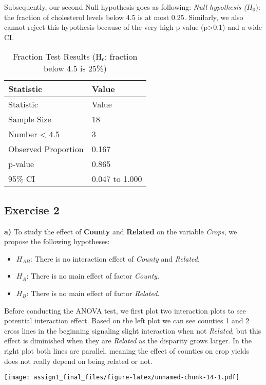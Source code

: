 \documentclass[
]{article}
\providecommand{\tightlist}{%
  \setlength{\itemsep}{0pt}\setlength{\parskip}{0pt}}
\begin{document}
Subsequently, our second Null hypothesis goes as following: \emph{Null
hypothesis (}\(H_0\)): the fraction of cholesterol levels below 4.5 is
at most 0.25. Similarly, we also cannot reject this hypothesis because
of the very high p-value (p\textgreater0.1) and a wide CI.

\begin{longtable}[]{@{}ll@{}}
\caption{Fraction Test Results (H₀: fraction below 4.5 is
25\%)}\tabularnewline
\toprule\noalign{}
Statistic & Value \\
\midrule\noalign{}
\endfirsthead
\toprule\noalign{}
Statistic & Value \\
\midrule\noalign{}
\endhead
\bottomrule\noalign{}
\endlastfoot
Sample Size & 18 \\
Number \textless{} 4.5 & 3 \\
Observed Proportion & 0.167 \\
p-value & 0.865 \\
95\% CI & 0.047 to 1.000 \\
\end{longtable}

\subsection{Exercise 2}\label{exercise-2}

\textbf{a)} To study the effect of \textbf{County} and \textbf{Related}
on the variable \emph{Crops}, we propose the following hypotheses:

\begin{itemize}
\tightlist
\item
  \(H_{AB}\): There is no interaction effect of \emph{County} and
  \emph{Related}.
\item
  \(H_A\): There is no main effect of factor \emph{County}.
\item
  \(H_B\): There is no main effect of factor \emph{Related}.
\end{itemize}

Before conducting the ANOVA test, we first plot two interaction plots to
see potential interaction effect. Based on the left plot we can see
counties 1 and 2 cross lines in the beginning signaling slight
interaction when not \emph{Related}, but this effect is diminished when
they are \emph{Related} as the disparity grows larger. In the right plot
both lines are parallel, meaning the effect of counties on crop yields
does not really depend on being related or not.

\texttt{[image: assign1\_final\_files/figure-latex/unnamed-chunk-14-1.pdf]}
\end{document}
